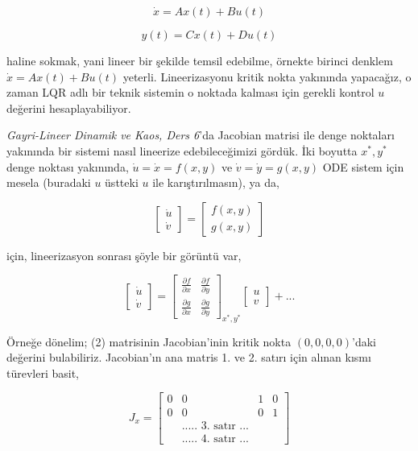 \documentclass[12pt,fleqn]{article}\usepackage{../../common}
\begin{document}
$$
\dot{x} = Ax(t) + B u(t)
$$

$$
y(t) = C x(t) + D u(t)
$$

haline sokmak, yani lineer bir şekilde temsil edebilme, örnekte birinci
denklem $\dot{x} = Ax(t) + B u(t)$ yeterli. Lineerizasyonu kritik nokta
yakınında yapacağız, o zaman LQR adlı bir teknik sistemin o noktada kalması
için gerekli kontrol $u$ değerini hesaplayabiliyor.

{\em Gayri-Lineer Dinamik ve Kaos, Ders 6}'da Jacobian matrisi ile denge
noktaları yakınında bir sistemi nasıl lineerize edebileceğimizi gördük. İki
boyutta $x^\ast,y^\ast$ denge noktası yakınında, $\dot{u} = \dot{x} = f(x,y)$ ve
$\dot{v} = \dot{y} = g(x,y)$ ODE sistem için mesela (buradaki $u$ üstteki
$u$ ile karıştırılmasın), ya da,

$$
\left[\begin{array}{r}
\dot{u} \\ \dot{v}
\end{array}\right] = 
\left[\begin{array}{r}
f(x,y) \\ g(x,y)
\end{array}\right] 
$$

için, lineerizasyon sonrası şöyle bir görüntü var,

$$
\left[\begin{array}{r}
\dot{u} \\ \dot{v}
\end{array}\right]
=
\left[\begin{array}{rr}
\frac{\partial f}{\partial x} & \frac{\partial f}{\partial y} \\
\frac{\partial g}{\partial x} & \frac{\partial g}{\partial y} 
\end{array}\right]_{x^\ast,y^\ast  }
\left[\begin{array}{r} u \\ v \end{array}\right]
+ ...
$$

Örneğe dönelim; (2) matrisinin Jacobian'inin kritik nokta $(0,0,0,0)$'daki
değerini bulabiliriz. Jacobian'ın ana matris 1. ve 2. satırı için alınan
kısmı türevleri basit,

$$
J_x = \left[\begin{array}{cccc}
0 & 0 & 1 & 0 \\
0 & 0 & 0 & 1 \\
& \textrm{..... 3. satır ...} &  &  \\ 
& \textrm{..... 4. satır ...} &  & 
\end{array}\right]
$$
\end{document}
